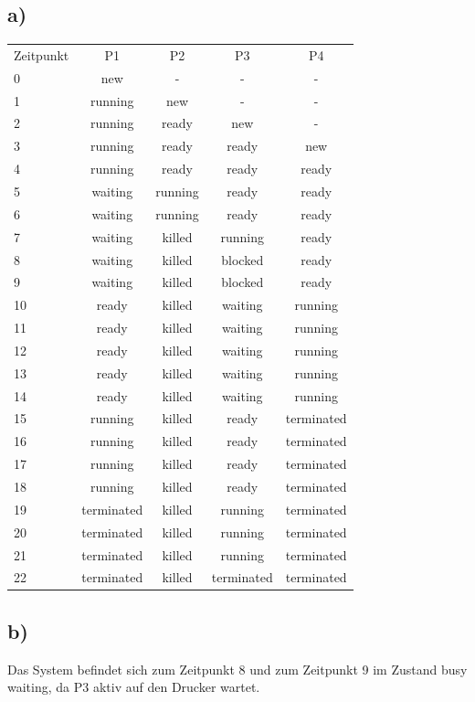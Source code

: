 \documentclass[numbers=noendperiod]{scrartcl}
\begin{document}
\subsection*{a)}
\begin{tabular}{lcccc}
	Zeitpunkt & P1 & P2 & P3 & P4 \\
	0 & new & - & - & - \\
	1 & running & new & - & - \\
	2 & running & ready  & new & - \\
	3 & running & ready & ready & new \\
	4 & running & ready & ready & ready \\
	5 & waiting & running & ready & ready \\
	6 & waiting & running & ready & ready \\
	7 & waiting & killed & running & ready \\
	8 & waiting & killed & blocked & ready \\
	9 & waiting & killed & blocked & ready \\
	10 & ready & killed & waiting & running \\
	11 & ready & killed & waiting & running \\
	12 & ready & killed & waiting & running \\
	13 & ready & killed & waiting & running \\
	14 & ready & killed & waiting & running \\
	15 & running & killed & ready & terminated \\
	16 & running & killed & ready & terminated \\
	17 & running & killed & ready & terminated \\
	18 & running & killed & ready & terminated \\
	19 & terminated & killed & running & terminated \\
	20 & terminated & killed & running & terminated \\
	21 & terminated & killed & running & terminated \\
	22 & terminated & killed & terminated & terminated \\
	
\end{tabular}	
\subsection*{b)}
Das System befindet sich zum Zeitpunkt 8 und zum Zeitpunkt 9 im Zustand busy waiting, da P3 aktiv auf den Drucker wartet.
\end{document}
